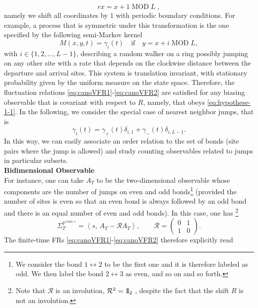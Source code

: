 \documentclass[a4paper,11pt]{article}
\numberwithin{equation}{section}
\newcommand{\bbbone}{\mathchoice {\rm 1\mskip-4mu l} {\rm 1\mskip-4mu l}
{\rm 1\mskip-4.5mu l} {\rm 1\mskip-5mu l}}
\begin{document}
$$r x = x+1 \; \mathrm{MOD} \; L \;,$$
namely we shift all coordinates by $1$ with periodic boundary conditions.
For example, a process that is symmetric under this transformation is the one specified by the following semi-Markov kernel
\begin{equation}
M(x,y,t)=\gamma_{i}(t)\quad  \mathrm{if} \quad y=x+i \; \mathrm{MOD} \; L,
\label{eq:gen}
\end{equation}
with $i \in \{1,2,\ldots,L-1\}$, describing a random walker on a ring possibly jumping on any other site with a rate that depends on the clockwise distance between the departure and arrival sites. This system is translation invariant, with stationary probability given by the uniform measure on the state space. Therefore, the fluctuation relations \eqref{eq:canoVFR1}-\eqref{eq:canoVFR2} are satisfied for any biasing observable that is covariant with respect to $R$, namely, that obeys \eqref{eq:hypothese-1-1}. In the following, we consider the special case of nearest neighbor jumps, that is
 \begin{equation}\label{eq:gen2}
    \gamma_{i}(t)=\gamma_{+}(t)\delta_{i,1}+\gamma_{-}(t)\delta_{i,L-1}. 
 \end{equation}
In this way, we can easily associate an order relation to the set of bonds (site pairs where the jump is allowed) and study counting observables related to jumps in particular subsets.
\\
\textbf{Bidimensional Observable} \\
\noindent
For instance, one can take $A_T$ to be the two-dimensional observable whose components are the number of jumps on even and odd bonds\footnote{We consider the bond $1 \leftrightarrow 2$ to be the first one and it is therefore labeled as odd. We then label the bond $2 \leftrightarrow 3$ as even, and so on and so forth.} (provided the number of sites is even so that an even bond is always followed by an odd bond and there is an equal number of even and odd bonds).
In this case, one has \footnote{Note that $\mathcal{R}$ is an involution,  $\mathcal{R}^2=\bbbone_2$ , despite the fact that the shift $R$ is not an involution.}
\begin{equation}
\varSigma_{T}^{\mathbb{P}^{\mathrm{cano},s}}= \left\langle s, \,  A_T  - \mathcal{R} A_T \right\rangle, \quad\quad \mathcal{R}= 
\begin{pmatrix}
    0 & 1 \\
    1 & 0
\end{pmatrix}.
\end{equation}
The finite-time FRs \eqref{eq:canoVFR1}-\eqref{eq:canoVFR2} therefore explicitly read
\end{document}
